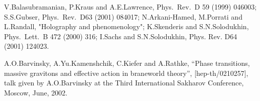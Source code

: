\documentclass[a4paper,12pt]{article}
\begin{document}
\begin{thebibliography}{99}
V.Balasubramanian, P.Kraus and A.E.Lawrence,
 Phys.\ Rev.\ D {59} (1999) 046003;
S.S.Gubser,
 Phys.\ Rev.\ D{63} (2001) 084017;
N.Arkani-Hamed, M.Porrati and L.Randall,
 "Holography and phenomenology";
 K.Skenderis and S.N.Solodukhin,
 Phys.\ Lett.\ B {472} (2000) 316;
 I.Sachs and S.N.Solodukhin,
 Phys. Rev. D{64} (2001) 124023.

A.O.Barvinsky, A.Yu.Kamenshchik, C.Kiefer
and A.Rathke, ``Phase transitions, massive gravitons and effective
action in braneworld theory'', [hep-th/0210257], talk given by
A.O.Barvinsky at the Third International Sakharov Conference,
Moscow, June, 2002.

\end{thebibliography}
\end{document}
